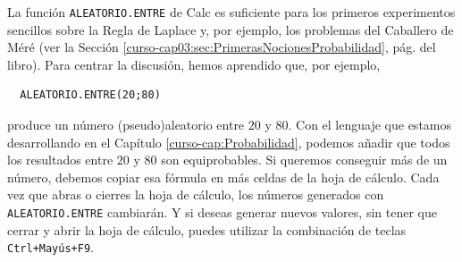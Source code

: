 \documentclass[10pt,a4paper]{article}\usepackage[]{graphicx}\usepackage[]{color}
\begin{document}
La función {\tt ALEATORIO.ENTRE} de Calc es suficiente para los primeros experimentos sencillos sobre la Regla de Laplace y, por ejemplo, los problemas del Caballero de Méré (ver la Sección \ref{curso-cap03:sec:PrimerasNocionesProbabilidad}, pág. \pageref{curso-cap03:sec:PrimerasNocionesProbabilidad} del libro). Para centrar la discusión, hemos aprendido que, por ejemplo,
\begin{verbatim}
  ALEATORIO.ENTRE(20;80)
\end{verbatim}
produce un número (pseudo)aleatorio entre $20$ y $80$. Con el lenguaje que estamos desarrollando en el Capítulo \ref{curso-cap:Probabilidad}, podemos añadir que todos los resultados entre $20$ y $80$ son equiprobables. Si queremos conseguir más de un número, debemos copiar esa fórmula en más celdas de la hoja de cálculo. Cada vez que abras o cierres la hoja de cálculo, los números generados con  {\tt ALEATORIO.ENTRE} cambiarán. Y si deseas generar nuevos valores, sin tener que cerrar y abrir la hoja de cálculo, puedes utilizar la combinación de teclas {\tt Ctrl+Mayús+F9}.
\end{document}
